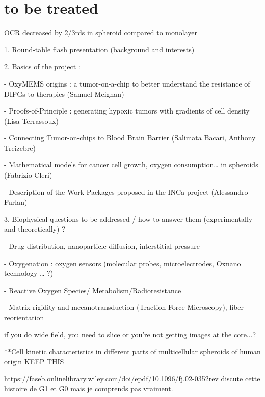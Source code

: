 \documentclass[11pt,a4paper]{article}
\begin{document}
 
 
\section*{to be treated}

OCR decreased by 2/3rds in spheroid compared to monolayer




1.      Round-table flash presentation (background and interests)

2.      Basics of the project :

-        OxyMEMS origins : a tumor-on-a-chip to better understand the resistance of DIPGs to therapies (Samuel Meignan) 

-        Proofs-of-Principle : generating hypoxic tumors with gradients of cell density (Lisa Terrassoux) 

-        Connecting Tumor-on-chips to Blood Brain Barrier (Salimata Bacari, Anthony Treizebre)

-        Mathematical models for cancer cell growth, oxygen consumption… in spheroids (Fabrizio Cleri) 

-        Description of the Work Packages proposed in the INCa project (Alessandro Furlan)

3.      Biophysical questions to be addressed / how to answer them (experimentally and theoretically) ?

-        Drug distribution, nanoparticle diffusion, interstitial pressure

-        Oxygenation : oxygen sensors (molecular probes, microelectrodes, Oxnano technology … ?)

-        Reactive Oxygen Species/ Metabolism/Radioresistance

-        Matrix rigidity and mecanotransduction (Traction Force Microscopy), fiber reorientation

if you do wide field, you need to slice or you're not getting images at the core...?


**Cell kinetic characteristics in different parts of multicellular spheroids of human origin KEEP THIS

https://faseb.onlinelibrary.wiley.com/doi/epdf/10.1096/fj.02-0352rev discute cette histoire de G1 et G0 mais je comprends pas vraiment.
\newpage


\end{document}
